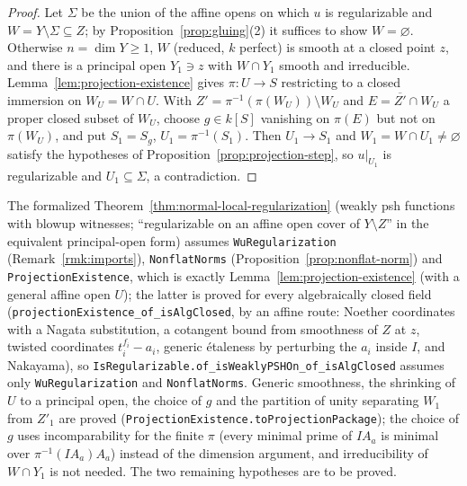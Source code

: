 \begin{proof}
Let $\Sigma$ be the union of the affine opens on which $u$ is regularizable and $W=Y\setminus\Sigma\subseteq Z$;
by Proposition~\ref{prop:gluing}(2) it suffices to show $W=\varnothing$. Otherwise $n=\dim Y\ge1$,
$W$ (reduced, $k$ perfect) is smooth at a closed point $z$, and there is a principal open
$Y_1\ni z$ with $W\cap Y_1$ smooth and irreducible. Lemma~\ref{lem:projection-existence} gives
$\pi\colon U\to S$ restricting to a closed immersion on $W_U=W\cap U$. With
$Z'=\pi^{-1}(\pi(W_U))\setminus W_U$ and $E=\overline{Z'}\cap W_U$ a proper closed subset of $W_U$,
choose $g\in k[S]$ vanishing on $\pi(E)$ but not on $\pi(W_U)$, and put $S_1=S_g$, $U_1=\pi^{-1}(S_1)$.
Then $U_1\to S_1$ and $W_1=W\cap U_1\ne\varnothing$ satisfy the hypotheses of
Proposition~\ref{prop:projection-step}, so $u|_{U_1}$ is regularizable and $U_1\subseteq\Sigma$, a
contradiction.
\end{proof}

\begin{remark}\label{rmk:local-regularization-conditional}
The formalized Theorem~\ref{thm:normal-local-regularization} (weakly psh functions with blowup
witnesses; ``regularizable on an affine open cover of $Y\setminus Z$'' in the equivalent principal-open
form) assumes \texttt{WuRegularization} (Remark~\ref{rmk:imports}),
\texttt{NonflatNorms} (Proposition~\ref{prop:nonflat-norm}) and \texttt{ProjectionExistence}, which is exactly Lemma~\ref{lem:projection-existence} (with a general
affine open $U$); the latter is proved for every algebraically closed field
(\texttt{projectionExistence\_of\_isAlgClosed}, by an affine route: Noether coordinates with a Nagata
substitution, a cotangent bound from smoothness of $Z$ at $z$, twisted coordinates $t_i^{f_i}-a_i$, generic
\'etaleness by perturbing the $a_i$ inside $I$, and Nakayama), so
\texttt{IsRegularizable.of\_isWeaklyPSHOn\_of\_isAlgClosed} assumes only \texttt{WuRegularization} and
\texttt{NonflatNorms}. Generic smoothness, the shrinking of $U$ to a principal open, the choice of $g$ and the
partition of unity separating $W_1$ from $Z'_1$ are proved
(\texttt{ProjectionExistence.toProjectionPackage}); the choice of $g$ uses incomparability for the finite
$\pi$ (every minimal prime of $IA_a$ is minimal over $\pi^{-1}(IA_a)A_a$) instead of the dimension argument,
and irreducibility of $W\cap Y_1$ is not needed. The two remaining hypotheses are to be proved.
\end{remark}


